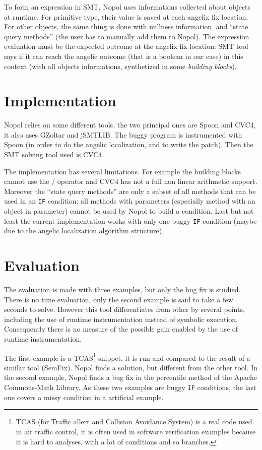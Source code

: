 To form an expression in SMT, \textsf{Nopol} uses informations collected about objects at runtime. For primitive type, their value is saved at each angelix fix location. For other objects, the same thing is done with nullness information, and ``state query methods'' (the user has to manually add them to \textsf{Nopol}). The expression evaluation must be the expected outcome at the angelix fix location: SMT tool says if it can reach the angelic outcome (that is a boolean in our case) in this context (with all objects informations, synthetized in some \emph{building blocks}). 

\section{Implementation}

\textsf{Nopol} relies on some different tools, the two principal ones are \textsf{Spoon} and \textsf{CVC4}, it also uses \textsf{GZoltar} and \textsf{jSMTLIB}. The buggy program is instrumented with \textsf{Spoon} (in order to do the angelic localization, and to write the patch). Then the SMT solving tool used is \textsf{CVC4}.

The implementation has several limitations. For example the building blocks cannot use the $/$ operator and \textsf{CVC4} has not a full non linear arithmetic support. Moreover the ``state query methods'' are only a subset of all methods that can be used in an \verb!IF! condition: all methods with parameters (especially method with an object in parameter) cannot be used by \textsf{Nopol} to build a condition. Last but not least the current implementation works with only one buggy \verb!IF! condition (maybe due to the angelic localization algorithm structure).

\section{Evaluation}

The evaluation is made with three examples, but only the bug fix is studied. There is no time evaluation, only the second example is said to take a few seconds to solve. However this tool differentiates from other by several points, including the use of runtime instrumentation instead of symbolic execution. Consequently there is no measure of the possible gain enabled by the use of runtime instrumentation.

The first example is a TCAS\footnote{TCAS (for Traffic allert and Collision Avoidance System) is a real code used in air traffic control, it is often used in software verification examples because it is hard to analyses, with a lot of conditions and so branches.} snippet, it is run and compared to the result of a similar tool (\textsf{SemFix}). \textsf{Nopol} finds a solution, but different from the other tool. In the second example, \textsf{Nopol} finds a bug fix in the percentile method of the Apache Commons-Math Library. As these two examples are buggy \verb!IF! conditions, the last one covers a missy condition in a artificial example.

